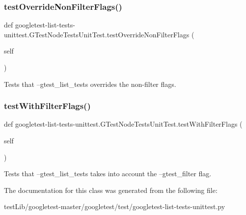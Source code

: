 \subsubsection{\texorpdfstring{test\+Override\+Non\+Filter\+Flags()}{testOverrideNonFilterFlags()}}
{\footnotesize\ttfamily def googletest-\/list-\/tests-\/unittest.\+G\+Test\+Node\+Tests\+Unit\+Test.\+test\+Override\+Non\+Filter\+Flags (\begin{DoxyParamCaption}\item[{}]{self }\end{DoxyParamCaption})}

\begin{DoxyVerb}Tests that --gtest_list_tests overrides the non-filter flags.\end{DoxyVerb}
 \mbox{\label{classgoogletest-list-tests-unittest_1_1GTestListTestsUnitTest_adb60d2295fee8ed4af2a5ee1a32e5778}} 
\subsubsection{\texorpdfstring{test\+With\+Filter\+Flags()}{testWithFilterFlags()}}
{\footnotesize\ttfamily def googletest-\/list-\/tests-\/unittest.\+G\+Test\+Node\+Tests\+Unit\+Test.\+test\+With\+Filter\+Flags (\begin{DoxyParamCaption}\item[{}]{self }\end{DoxyParamCaption})}

\begin{DoxyVerb}Tests that --gtest_list_tests takes into account the
--gtest_filter flag.\end{DoxyVerb}
 

The documentation for this class was generated from the following file\+:\begin{DoxyCompactItemize}
\item 
test\+Lib/googletest-\/master/googletest/test/googletest-\/list-\/tests-\/unittest.\+py\end{DoxyCompactItemize}
